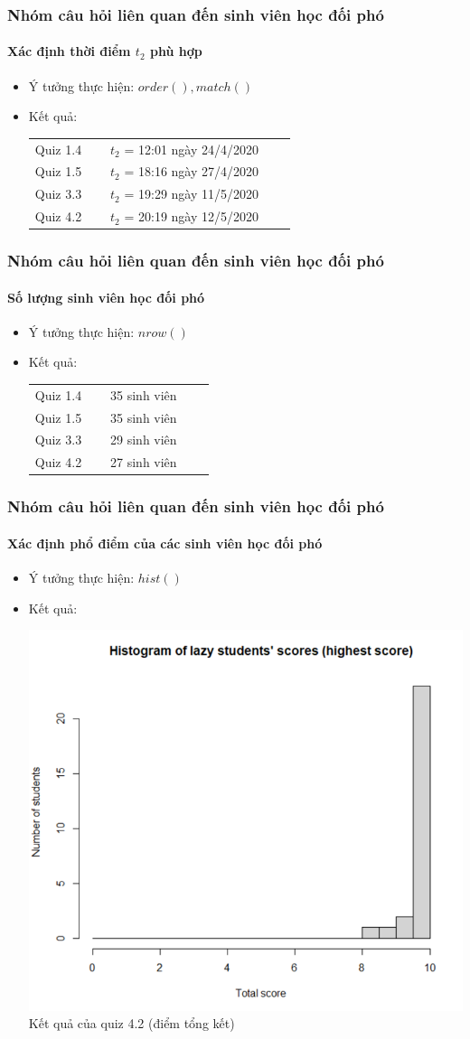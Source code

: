 \documentclass[english,10pt,table]{beamer}
\begin{document}
\frame
{
\frametitle{Nhóm câu hỏi liên quan đến sinh viên học đối phó}
\framesubtitle{Xác định thời điểm $t_2$ phù hợp}
\begin{itemize}
    \item Ý tưởng thực hiện: $order(), match()$
    \item Kết quả:\\
    \begin{center}
        \begin{tabular}{l l c c c}
             Quiz 1.4 & $\;$ & $t_2$ = 12:01 ngày 24/4/2020\\
             Quiz 1.5 & $\;$ & $t_2$ = 18:16 ngày 27/4/2020\\
             Quiz 3.3 & $\;$ & $t_2$ = 19:29 ngày 11/5/2020\\
             Quiz 4.2 & $\;$ & $t_2$ = 20:19 ngày 12/5/2020
        \end{tabular}
    \end{center}
\end{itemize}
}

\frame
{
\frametitle{Nhóm câu hỏi liên quan đến sinh viên học đối phó}
\framesubtitle{Số lượng sinh viên học đối phó}
\begin{itemize}
    \item Ý tưởng thực hiện: $nrow()$
    \item Kết quả:\\
    \begin{center}
        \begin{tabular}{l l c c c}
             Quiz 1.4 & $\;$ & 35 sinh viên\\
             Quiz 1.5 & $\;$ & 35 sinh viên\\
             Quiz 3.3 & $\;$ & 29 sinh viên\\
             Quiz 4.2 & $\;$ & 27 sinh viên
        \end{tabular}
    \end{center}
\end{itemize}
}

\frame
{
\frametitle{Nhóm câu hỏi liên quan đến sinh viên học đối phó}
\framesubtitle{Xác định phổ điểm của các sinh viên học đối phó}
\begin{itemize}
    \item Ý tưởng thực hiện: $hist()$
    \item Kết quả:\\
    \begin{center}
        \includegraphics[width = 6 cm]{Images/img7-2-4.png}\\
        Kết quả của quiz 4.2 (điểm tổng kết)
    \end{center}
\end{itemize}
}
\end{document}
